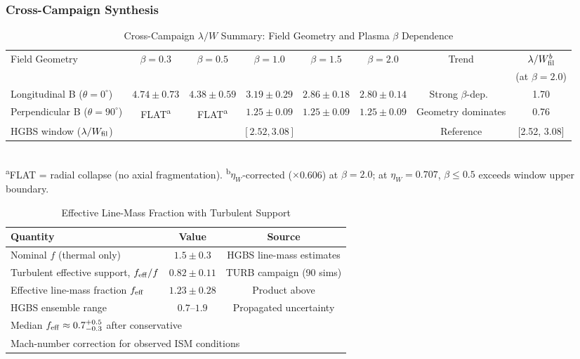 \documentclass[twoside,twocolumn]{mnras}
\begin{document}
\subsubsection{Cross-Campaign Synthesis}
\label{sec:cross_campaign_synthesis}

\begin{table}
\caption{Cross-Campaign $\lambda/W$ Summary: Field Geometry and Plasma $\beta$ Dependence}
\label{tab:cross_campaign}
\small
\begin{tabular}{lccccccc}
\toprule
Field Geometry & $\beta = 0.3$ & $\beta = 0.5$ & $\beta = 1.0$ & $\beta = 1.5$ & $\beta = 2.0$ & Trend & $\lambda/W_{\rm fil}^{b}$ \\
 & & & & & & & (at $\beta=2.0$) \\
\midrule
Longitudinal B ($\theta = 0^\circ$) & $4.74 \pm 0.73$ & $4.38 \pm 0.59$ & $3.19 \pm 0.29$ & $2.86 \pm 0.18$ & $2.80 \pm 0.14$ & Strong $\beta$-dep.\ & 1.70 \\
Perpendicular B ($\theta = 90^\circ$) & FLAT\textsuperscript{a} & FLAT\textsuperscript{a} & $1.25 \pm 0.09$ & $1.25 \pm 0.09$ & $1.25 \pm 0.09$ & Geometry dominates & 0.76 \\
\midrule
HGBS window ($\lambda/W_{\rm fil}$) & \multicolumn{5}{c}{$[2.52, 3.08]$} & Reference & [2.52, 3.08] \\
\bottomrule
\end{tabular}
\\[2pt]
\footnotesize \textsuperscript{a}FLAT = radial collapse (no axial fragmentation). \textsuperscript{b}$\eta_W$-corrected ($\times$0.606) at $\beta=2.0$; at $\eta_W = 0.707$, $\beta\leq0.5$ exceeds window upper boundary.
\end{table}

\begin{table}
\caption{Effective Line-Mass Fraction with Turbulent Support}
\label{tab:feff}
\small
\begin{tabular}{lcc}
\toprule
Quantity & Value & Source \\
\midrule
Nominal $f$ (thermal only) & $1.5 \pm 0.3$ & HGBS line-mass estimates \\
Turbulent effective support, $f_{\rm eff}/f$ & $0.82 \pm 0.11$ & TURB campaign (90 sims) \\
Effective line-mass fraction $f_{\rm eff}$ & $1.23 \pm 0.28$ & Product above \\
HGBS ensemble range & $0.7$--$1.9$ & Propagated uncertainty \\
\midrule
\multicolumn{3}{l}{\footnotesize Median $f_{\rm eff} \approx 0.7^{+0.5}_{-0.3}$ after conservative}\\
\multicolumn{3}{l}{\footnotesize Mach-number correction for observed ISM conditions}\\
\bottomrule
\end{tabular}
\end{table}
\end{document}
